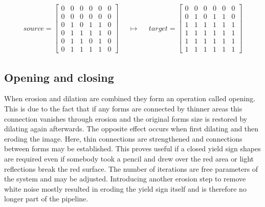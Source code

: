 \documentclass{report}
\begin{document}
\begin{align}\label{eq:morph_dilation-example}
  source = \begin{bmatrix}
    0 & 0 & 0 & 0 & 0 & 0 \\
    0 & 0 & 0 & 0 & 0 & 0 \\
    0 & 1 & 0 & 1 & 1 & 0 \\
    0 & 1 & 1 & 1 & 1 & 0 \\
    0 & 1 & 1 & 0 & 1 & 0 \\
    0 & 1 & 1 & 1 & 1 & 0
  \end{bmatrix}
  & &
  \mapsto
  & &
  target = \begin{bmatrix}
    0 & 0 & 0 & 0 & 0 & 0 \\
    0 & 1 & 0 & 1 & 1 & 0 \\
    1 & 1 & 1 & 1 & 1 & 1 \\
    1 & 1 & 1 & 1 & 1 & 1 \\
    1 & 1 & 1 & 1 & 1 & 1 \\
    1 & 1 & 1 & 1 & 1 & 1
  \end{bmatrix}
\end{align}


\subsection{Opening and closing}

When erosion and dilation are combined they form an operation called
opening. This is due to the fact that if any forms are connected by
thinner areas this connection vanishes through erosion and the
original forms size is restored by dilating again afterwards. The
opposite effect occurs when first dilating and then eroding the
image. Here, thin connections are strengthened and connections between
forms may be established. This proves useful if a closed yield sign
shapes are required even if somebody took a pencil and drew over the
red area or light reflections break the red surface. The number of
iterations are free parameters of the system and may be
adjusted. Introducing another erosion step to remove white noise
mostly resulted in eroding the yield sign itself and is therefore no
longer part of the pipeline.
\end{document}

